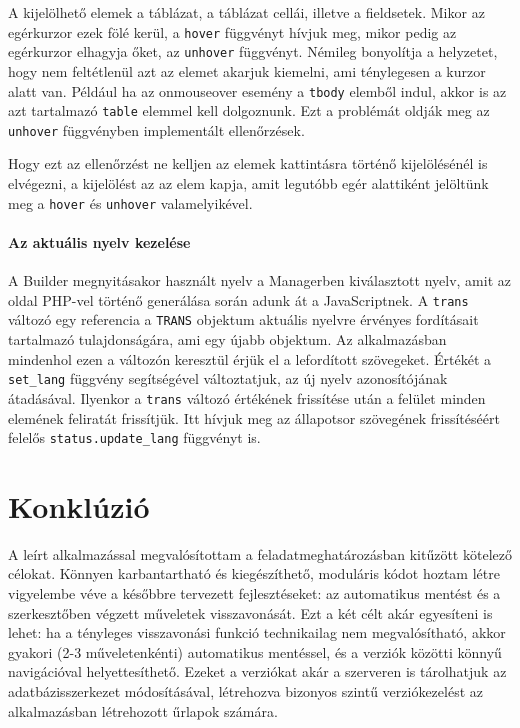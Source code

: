 \documentclass[12pt,a4paper,twoside]{article}
\begin{document}
A kijelölhető elemek a táblázat, a táblázat cellái, illetve a fieldsetek. Mikor
az egérkurzor ezek fölé kerül, a \texttt{hover} függvényt hívjuk meg, mikor
pedig az egérkurzor elhagyja őket, az \texttt{unhover} függvényt. Némileg
bonyolítja a helyzetet, hogy nem feltétlenül azt az elemet akarjuk kiemelni, ami
ténylegesen a kurzor alatt van. Például ha az onmouseover esemény a
\texttt{tbody} elemből indul, akkor is az azt tartalmazó \texttt{table} elemmel
kell dolgoznunk. Ezt a problémát oldják meg az \texttt{unhover} függvényben
implementált ellenőrzések.

Hogy ezt az ellenőrzést ne kelljen az elemek kattintásra történő kijelölésénél is
elvégezni, a kijelölést az az elem kapja, amit legutóbb egér alattiként
jelöltünk meg a \texttt{hover} és \texttt{unhover} valamelyikével.


\paragraph{Az aktuális nyelv kezelése}
A Builder megnyitásakor használt nyelv a Managerben kiválasztott nyelv, amit az
oldal PHP-vel történő generálása során adunk át a JavaScriptnek. A
\texttt{trans} változó egy referencia a \texttt{TRANS} objektum aktuális nyelvre
érvényes fordításait tartalmazó tulajdonságára, ami egy újabb objektum. Az
alkalmazásban mindenhol ezen a változón keresztül érjük el a lefordított
szövegeket. Értékét a \texttt{set\_lang} függvény segítségével változtatjuk, az
új nyelv azonosítójának átadásával. Ilyenkor a \texttt{trans} változó értékének
frissítése után a felület minden elemének feliratát frissítjük. Itt hívjuk meg
az állapotsor szövegének frissítéséért felelős \texttt{status.update\_lang}
függvényt is.


\section{Konklúzió}
A leírt alkalmazással megvalósítottam a feladatmeghatározásban kitűzött kötelező
célokat. Könnyen karbantartható és kiegészíthető, moduláris kódot hoztam létre
vigyelembe véve a későbbre tervezett fejlesztéseket: az automatikus mentést és a
szerkesztőben végzett műveletek visszavonását. Ezt a két célt akár egyesíteni is
lehet: ha a tényleges visszavonási funkció technikailag nem megvalósítható,
akkor gyakori (2-3 műveletenkénti) automatikus mentéssel, és a verziók közötti
könnyű navigációval helyettesíthető. Ezeket a verziókat akár a szerveren is
tárolhatjuk az adatbázisszerkezet módosításával, létrehozva bizonyos szintű
verziókezelést az alkalmazásban létrehozott űrlapok számára.
\end{document}
